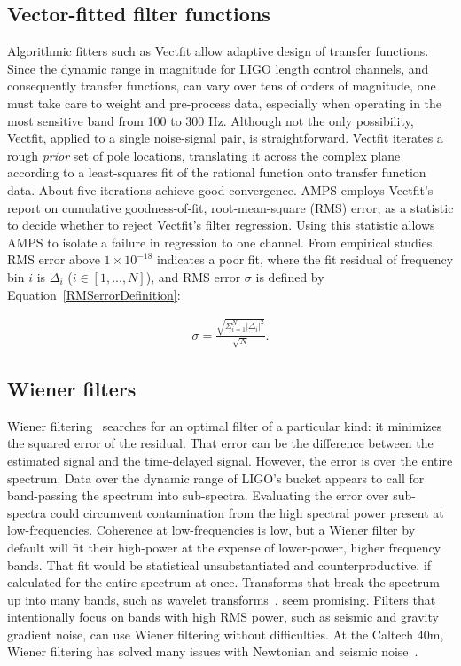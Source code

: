         \subsection{Vector-fitted filter functions}
        \label{vectfit}

            Algorithmic fitters such as Vectfit allow adaptive design of transfer functions. Since the dynamic range in magnitude for LIGO length control channels, and consequently transfer functions, can vary over tens of orders of magnitude, one must take care to weight and pre-process data, especially when operating in the most sensitive band from 100 to 300 Hz. Although not the only possibility, Vectfit, applied to a single noise-signal pair, is straightforward. Vectfit iterates a rough \textit{prior} set of pole locations, translating it across the complex plane according to a least-squares fit of the rational function onto transfer function data. About five iterations achieve good convergence. AMPS employs Vectfit's report on cumulative goodness-of-fit, root-mean-square (RMS) error, as a statistic to decide whether to reject Vectfit's filter regression. Using this statistic allows AMPS to isolate a failure in regression to one channel. From empirical studies, RMS error above $1\times 10^{-18}$ indicates a poor fit, where the fit residual of frequency bin $i$ is $\Delta_i$ ($i \in [1,...,N]$), and RMS error $\sigma$ is defined by Equation~\ref{RMSerrorDefinition}:

\begin{eqnarray}
\sigma = \frac{\sqrt{\Sigma_{i=1}^N \left| \Delta_i \right|^2}}{\sqrt{N}}\label{RMSerrorDefinition}.
\end{eqnarray}

        \subsection{Wiener filters}
        \label{wiener_filters}

            Wiener filtering~\cite{Wiener1949} searches for an optimal filter of a particular kind: it minimizes the squared error of the residual. That error can be the difference between the estimated signal and the time-delayed signal. However, the error is over the entire spectrum. Data over the dynamic range of LIGO's bucket appears to call for band-passing the spectrum into sub-spectra. Evaluating the error over sub-spectra could circumvent contamination from the high spectral power present at low-frequencies. Coherence at low-frequencies is low, but a Wiener filter by default will fit their high-power at the expense of lower-power, higher frequency bands. That fit would be statistical unsubstantiated and counterproductive, if calculated for the entire spectrum at once. Transforms that break the spectrum up into many bands, such as wavelet transforms~\cite{KlimenkoSite}, seem promising. Filters that intentionally focus on bands with high RMS power, such as seismic and gravity gradient noise, can use Wiener filtering without difficulties. At the Caltech 40m, Wiener filtering has solved many issues with Newtonian and seismic noise~\cite{Driggers2012ActiveNoise}.

